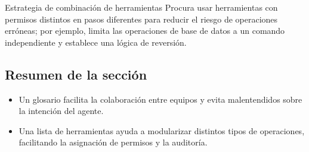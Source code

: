 \begin{knowledgebox}{Estrategia de combinación de herramientas}
Procura usar herramientas con permisos distintos en pasos diferentes para reducir el riesgo de operaciones erróneas; por ejemplo, limita las operaciones de base de datos a un comando independiente y establece una lógica de reversión.
\end{knowledgebox}

\subsection{Resumen de la sección}
\begin{itemize}
    \item Un glosario facilita la colaboración entre equipos y evita malentendidos sobre la intención del agente.
    \item Una lista de herramientas ayuda a modularizar distintos tipos de operaciones, facilitando la asignación de permisos y la auditoría.
\end{itemize}
